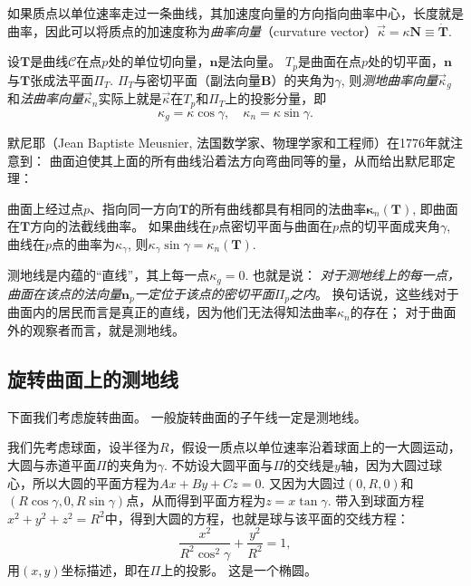 \documentclass{article}
\begin{document}
如果质点以单位速率走过一条曲线，其加速度向量的方向指向曲率中心，长度就是曲率，因此可以将质点的加速度称为\emph{曲率向量}（curvature vector）$\overrightarrow{\kappa}=\kappa\mathbf{N}\equiv\dot{\mathbf{T}}$.

设$\mathbf{T}$是曲线$\mathcal{C}$在点$p$处的单位切向量，$\mathbf{n}$是法向量。
$T_{p}$是曲面在点$p$处的切平面，$\mathbf{n}$与$\mathbf{T}$张成法平面$\Pi_{T}$.
$\Pi_{T}$与密切平面（副法向量$\mathbf{B}$）的夹角为$\gamma$, 则\emph{测地曲率向量}$\overrightarrow{\kappa}_{g}$和\emph{法曲率向量}$\overrightarrow{\kappa}_{n}$实际上就是$\overrightarrow{\kappa}$在$T_{p}$和$\Pi_{T}$上的投影分量，即
\begin{equation}
    \kappa_{g}=\kappa\cos\gamma, \quad
    \kappa_{n}=\kappa\sin\gamma.
\end{equation}

默尼耶（Jean Baptiste Meusnier, 法国数学家、物理学家和工程师）在1776年就注意到：
曲面迫使其上面的所有曲线沿着法方向弯曲同等的量，从而给出默尼耶定理：
\begin{tcolorbox}[colback=white, arc=3mm, auto outer arc]
\begin{minipage}[c,t]{1.0\textwidth}
\kaishu
曲面上经过点$p$、指向同一方向$\mathbf{T}$的所有曲线都具有相同的法曲率$\mathbf{\kappa}_{n}(\mathbf{T})$, 即曲面在$\mathbf{T}$方向的法截线曲率。
如果曲线在$p$点密切平面与曲面在$p$点的切平面成夹角$\gamma$, 曲线在$p$点的曲率为$\kappa_{\gamma}$, 
则$\kappa_{\gamma}\sin\gamma=\kappa_{n}(\mathbf{T})$.
\end{minipage}
\end{tcolorbox}

测地线是内蕴的“直线”，其上每一点$\kappa_{g}=0$.
也就是说：
\emph{对于测地线上的每一点，曲面在该点的法向量$\mathbf{n}_{p}$一定位于该点的密切平面$\Pi_{p}$之内}。
换句话说，这些线对于曲面内的居民而言是真正的直线，因为他们无法得知法曲率$\kappa_{n}$的存在；
对于曲面外的观察者而言，就是测地线。

\subsection{旋转曲面上的测地线}
下面我们考虑旋转曲面。
一般旋转曲面的子午线一定是测地线。

我们先考虑球面，设半径为$R$，假设一质点以单位速率沿着球面上的一大圆运动，大圆与赤道平面$\Pi$的夹角为$\gamma$.
不妨设大圆平面与$\Pi$的交线是$y$轴，因为大圆过球心，所以大圆的平面方程为$Ax+By+Cz=0$.
又因为大圆过$(0, R, 0)$和$(R\cos\gamma, 0, R\sin\gamma)$点，从而得到平面方程为$z=x\tan\gamma$.
带入到球面方程$x^{2}+y^{2}+z^{2}=R^{2}$中，得到大圆的方程，也就是球与该平面的交线方程：
\begin{equation*}
    \frac{x^{2}}{R^{2}\cos^{2}\gamma}+\frac{y^{2}}{R^{2}}=1,
\end{equation*}
用$(x, y)$坐标描述，即在$\Pi$上的投影。
这是一个椭圆。
\end{document}
